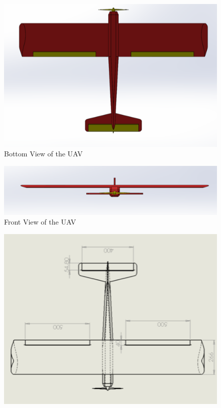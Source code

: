 \documentclass[12pt]{article}
\begin{document}
\begin{figure}[h!]
    \includegraphics[width=14.5cm]{bottom.png}
    \caption{Bottom View of the UAV}
\end{figure}

\begin{figure}[h!]
    \includegraphics[width=14.5cm]{front.png}
    \caption{Front View of the UAV}
\end{figure}


\begin{figure}[h!]
    \includegraphics[width=14.5cm, scale=1]{drawing1.png}
\end{figure}
\end{document}

